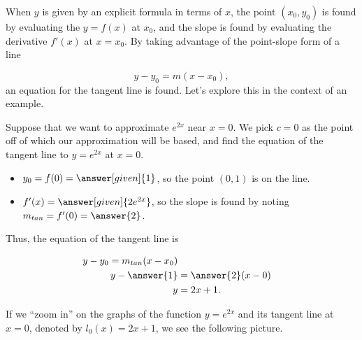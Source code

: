 \documentclass{ximera}
\begin{document}
\begin{image}

\end{image}

When $y$ is given by an explicit formula in terms of $x$, the point $(x_0,y_0)$ is found by evaluating the $y=f(x)$ at $x_0$, and the slope is found by evaluating the derivative $f'(x)$ at $x=x_0$.  By taking advantage of the point-slope form of a line

\[
y-y_0=m\left(x-x_0\right),
\]
an equation for the tangent line is found.  Let's explore this in the context of an example.

Suppose that we want to approximate $e^{2x}$ near $x=0$.  We pick $c=0$ as the point off of which our approximation will be based, and find the equation of the tangent line to $y=e^{2x}$ at $x=0$. 
\begin{itemize}
\item $y_0=f(0) = \answer[given]{1}$, so the point $(0,1)$ is on the line.
\item $f'(x) = \answer[given]{2e^{2x}}$, so the slope is found by noting $m_{tan} = f'(0) = \answer{2}$.
\end{itemize}
Thus, the equation of the tangent line is

\begin{align*}
y-y_0 = m_{tan} (x-x_0) \\
y- \answer{1} &=\answer{2}(x-0) \\
y&=2x+1 .
\end{align*}

If we ``zoom in'' on the graphs of the function $y=e^{2x}$ and its tangent line at $x=0$, denoted by $l_0(x)=2x+1$, we see the following picture.
\end{document}
